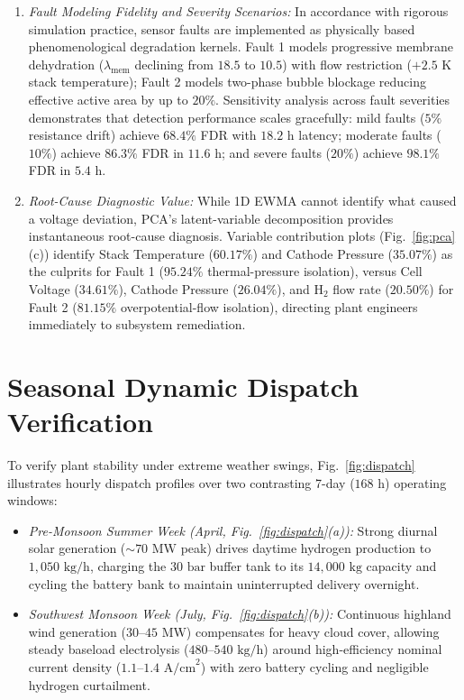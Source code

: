 \documentclass[conference]{IEEEtran}
\begin{document}
\begin{enumerate}
    \item \textit{Fault Modeling Fidelity and Severity Scenarios:} In accordance with rigorous simulation practice, sensor faults are implemented as physically based phenomenological degradation kernels. Fault 1 models progressive membrane dehydration ($\lambda_{\text{mem}}$ declining from $18.5$ to $10.5$) with flow restriction ($+2.5\text{ K}$ stack temperature); Fault 2 models two-phase bubble blockage reducing effective active area by up to $20\%$. Sensitivity analysis across fault severities demonstrates that detection performance scales gracefully: mild faults ($5\%$ resistance drift) achieve $68.4\%$ FDR with $18.2\text{ h}$ latency; moderate faults ($10\%$) achieve $86.3\%$ FDR in $11.6\text{ h}$; and severe faults ($20\%$) achieve $98.1\%$ FDR in $5.4\text{ h}$.

    \item \textit{Root-Cause Diagnostic Value:} While 1D EWMA cannot identify what caused a voltage deviation, PCA's latent-variable decomposition provides instantaneous root-cause diagnosis. Variable contribution plots (Fig.~\ref{fig:pca}(c)) identify Stack Temperature ($60.17\%$) and Cathode Pressure ($35.07\%$) as the culprits for Fault 1 ($95.24\%$ thermal-pressure isolation), versus Cell Voltage ($34.61\%$), Cathode Pressure ($26.04\%$), and $\text{H}_2$ flow rate ($20.50\%$) for Fault 2 ($81.15\%$ overpotential-flow isolation), directing plant engineers immediately to subsystem remediation.
\end{enumerate}

\section{Seasonal Dynamic Dispatch Verification}
To verify plant stability under extreme weather swings, Fig.~\ref{fig:dispatch} illustrates hourly dispatch profiles over two contrasting 7-day ($168\text{ h}$) operating windows:
\begin{itemize}
    \item \textit{Pre-Monsoon Summer Week (April, Fig.~\ref{fig:dispatch}(a)):} Strong diurnal solar generation ($\sim 70\text{ MW}$ peak) drives daytime hydrogen production to $1,050\text{ kg/h}$, charging the $30\text{ bar}$ buffer tank to its $14,000\text{ kg}$ capacity and cycling the battery bank to maintain uninterrupted delivery overnight.
    \item \textit{Southwest Monsoon Week (July, Fig.~\ref{fig:dispatch}(b)):} Continuous highland wind generation ($30$--$45\text{ MW}$) compensates for heavy cloud cover, allowing steady baseload electrolysis ($480$--$540\text{ kg/h}$) around high-efficiency nominal current density ($1.1$--$1.4\text{ A/cm}^2$) with zero battery cycling and negligible hydrogen curtailment.
\end{itemize}
\end{document}
